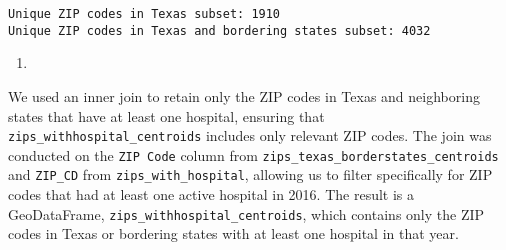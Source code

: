 \documentclass[
  letterpaper,
  DIV=11,
  numbers=noendperiod]{scrartcl}
\providecommand{\tightlist}{%
  \setlength{\itemsep}{0pt}\setlength{\parskip}{0pt}}\usepackage{longtable,booktabs,array}
\begin{document}
\begin{verbatim}
Unique ZIP codes in Texas subset: 1910
Unique ZIP codes in Texas and bordering states subset: 4032
\end{verbatim}

\begin{enumerate}
\def\labelenumi{\arabic{enumi}.}
\setcounter{enumi}{2}
\tightlist
\item
\end{enumerate}

We used an inner join to retain only the ZIP codes in Texas and
neighboring states that have at least one hospital, ensuring that
\texttt{zips\_withhospital\_centroids} includes only relevant ZIP codes.
The join was conducted on the \texttt{ZIP\ Code} column from
\texttt{zips\_texas\_borderstates\_centroids} and \texttt{ZIP\_CD} from
\texttt{zips\_with\_hospital}, allowing us to filter specifically for
ZIP codes that had at least one active hospital in 2016. The result is a
GeoDataFrame, \texttt{zips\_withhospital\_centroids}, which contains
only the ZIP codes in Texas or bordering states with at least one
hospital in that year.
\end{document}

